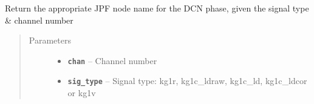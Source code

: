\documentclass[letterpaper,10pt,english]{sphinxmanual}
\begin{document}
\begin{fulllineitems}

\begin{fulllineitems}
\label{consts:consts.Consts.CORR_VIB}
\end{fulllineitems}


\begin{fulllineitems}
\label{consts:consts.Consts.FJ_DCN}
\end{fulllineitems}


\begin{fulllineitems}
\label{consts:consts.Consts.FJ_MET}
\end{fulllineitems}


\begin{fulllineitems}
\label{consts:consts.Consts.JXB_FAC}
\end{fulllineitems}


\begin{fulllineitems}
\label{consts:consts.Consts.get_phase_node_dcn}
Return the appropriate JPF node name for the DCN phase, given the signal type \& channel number
\begin{quote}\begin{description}
\item[{Parameters}] \leavevmode\begin{itemize}
\item {} 
\textbf{\texttt{chan}} -- Channel number

\item {} 
\textbf{\texttt{sig\_type}} -- Signal type: kg1r, kg1c\_ldraw, kg1c\_ld, kg1c\_ldcor or kg1v


\end{itemize}
\end{description}
\end{quote}
\end{fulllineitems}
\end{fulllineitems}
\end{document}
